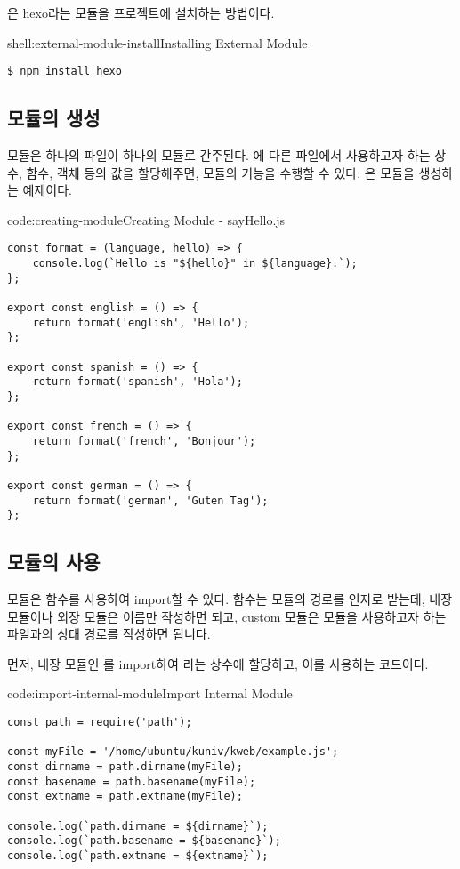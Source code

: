 은 hexo라는 모듈을 프로젝트에 설치하는 방법이다.

\begin{shellenv}{shell:external-module-install}{Installing External Module}\begin{verbatim}
$ npm install hexo
\end{verbatim}
\end{shellenv}

\subsection*{모듈의 생성}

모듈은 하나의 파일이 하나의 모듈로 간주된다. 에 다른 파일에서 사용하고자 하는 상수, 함수, 객체 등의 값을 할당해주면, 모듈의 기능을 수행할 수 있다. 은 모듈을 생성하는 예제이다.

\begin{codeenv}{code:creating-module}{Creating Module - sayHello.js}\begin{verbatim}
const format = (language, hello) => {
    console.log(`Hello is "${hello}" in ${language}.`);
};

export const english = () => {
    return format('english', 'Hello');
};

export const spanish = () => {
    return format('spanish', 'Hola');
};

export const french = () => {
    return format('french', 'Bonjour');
};

export const german = () => {
    return format('german', 'Guten Tag');
};
\end{verbatim}
\end{codeenv}

\subsection*{모듈의 사용}

모듈은  함수를 사용하여 import할 수 있다.  함수는 모듈의 경로를 인자로 받는데, 내장 모듈이나 외장 모듈은 이름만 작성하면 되고, custom 모듈은 모듈을 사용하고자 하는 파일과의 상대 경로를 작성하면 됩니다.

먼저, \은 내장 모듈인 를 import하여 라는 상수에 할당하고, 이를 사용하는 코드이다.

\begin{codeenv}{code:import-internal-module}{Import Internal Module}\begin{verbatim}
const path = require('path');

const myFile = '/home/ubuntu/kuniv/kweb/example.js';
const dirname = path.dirname(myFile);
const basename = path.basename(myFile);
const extname = path.extname(myFile);

console.log(`path.dirname = ${dirname}`);
console.log(`path.basename = ${basename}`);
console.log(`path.extname = ${extname}`);
\end{verbatim}
\end{codeenv}

